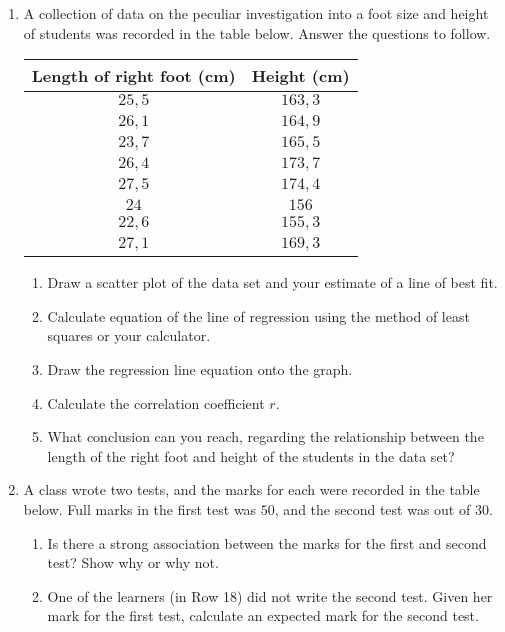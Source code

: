 \begin{eocexercises}{}
\begin{enumerate}
\item A collection of data on the peculiar investigation into a foot size and height of students was recorded in the table below. Answer the questions to follow.
\begin{center}
\begin{tabular}{|c|c|}\hline
Length of right foot (cm) & Height (cm)\\\hline
 $25,5$ & $163,3$ \\\hline
 $26,1$ & $164,9$ \\\hline 
 $23,7$ & $165,5$ \\\hline
 $26,4$ & $173,7$ \\\hline
 $27,5$ & $174,4$ \\\hline
 $24$ & $156$ \\\hline
 $22,6$ & $155,3$ \\\hline
 $27,1$ & $169,3$ \\\hline
\end{tabular}
\end{center}
\begin{enumerate}
\item Draw a scatter plot of the data set and your estimate of a line of best fit.
\item Calculate equation of the line of regression using the method of least squares or your calculator.
\item Draw the regression line equation onto the graph.
\item Calculate the correlation coefficient $r$.
\item What conclusion can you reach, regarding the relationship between the length of the right foot and height of the students in the data set?
\end{enumerate}
\item
A class wrote two tests, and the marks for each were recorded in the table below. Full marks in the first test was $50$, and the second test was out of $30$.

\begin{enumerate}
\item Is there a strong association between the marks for the first and second test? Show why or why not.

\item One of the learners (in Row 18) did not write the second test. Given her mark for the first test, calculate an expected mark for the second test.
\end{enumerate}


\end{enumerate}
\end{eocexercises}
